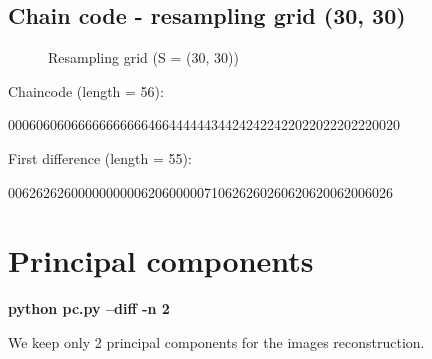 \pagebreak
\subsection{Chain code - resampling grid (30, 30)}

\begin{figure}[!htb]\centering
    \caption{\small{Resampling grid (S = (30, 30))}}
\end{figure}

Chaincode (length = 56):
\begin{center}
00060606066666666666466444444344242422422022022202220020
\end{center}

\bigskip

First difference (length = 55):
\begin{center}
0062626260000000000620600000710626260260620620062006026
\end{center}


\pagebreak

\section{Principal components}

\textbf{python pc.py --diff -n 2}


We keep only 2 principal components for the images reconstruction.

